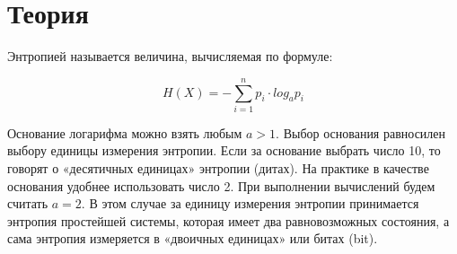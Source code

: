 \section{Теория}

Энтропией называется величина, вычисляемая по формуле:

\[
    H(X) = - \sum_{i=1}^n p_i \cdot log_a{p_i}
\]

Основание логарифма можно взять любым $a > 1$. Выбор основания равносилен выбору единицы измерения энтропии. Если за основание выбрать число 10, то говорят о «десятичных единицах» энтропии (дитах). На практике в качестве основания удобнее использовать число 2. При выполнении вычислений будем считать $a = 2$. В этом случае за единицу измерения энтропии принимается энтропия простейшей системы, которая имеет два равновозможных состояния, а сама энтропия измеряется в «двоичных единицах» или битах (bit).
